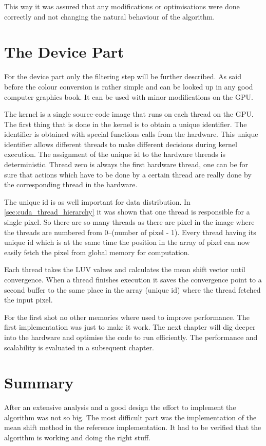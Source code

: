 This way it was assured that any modifications or optimisations were done 
correctly and not changing the natural behaviour of the algorithm. 

\section{The Device Part} %
\label{sec:the_device}
For the device part only the filtering step will be further described. As said
before the colour conversion is rather simple and can be looked up in any good
computer graphics book. It can be used with minor modifications on the \gls{GPU}. 

The kernel is a single source-code image that runs on each thread on the \gls{GPU}.
The first thing that is done in the kernel is to obtain a unique identifier. 
The identifier is obtained with special functions calls from the hardware. This
unique identifier allows different threads to make different decisions during
kernel execution. The assignment of the unique id to the hardware threads is
deterministic. Thread zero is always the first hardware thread, one can be for
sure that actions which have to be done by a certain thread are really done
by the corresponding thread in the hardware. 

The unique id is as well important for data distribution. 
In \autoref{sec:cuda_thread_hierarchy} it was shown that one thread is responsible
for a single pixel. So there are so many threads as there are pixel in the image 
where the threads are numbered from 0--(number of pixel - 1). Every thread having
its unique id which is at the same time the position in the array of pixel can
now easily fetch the pixel from global memory for computation. 

Each thread takes the \gls{LUV} values and calculates the mean shift vector 
until convergence. When a thread finishes execution it saves the convergence 
point to a second buffer to the same place in the array (unique id) where the 
thread fetched the input pixel. 

For the first shot no other memories where used to improve performance. The first
implementation was just to make it work. The next chapter will dig deeper into
the hardware and optimise the code to run efficiently. The performance
and scalability is evaluated in a subsequent chapter. 

\section{Summary} %
\label{sec:summary}
After an extensive analysis and a good design the effort to implement the algorithm
was not so big. The most difficult part was the implementation of the
mean shift method in the reference implementation. It had to be verified that
the algorithm is working and doing the right stuff. 

